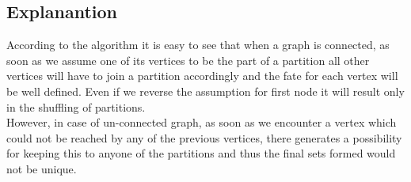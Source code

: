 \documentclass[20pt]{article}
\begin{document}
\subsection{Explanantion}
According to the algorithm it is easy to see that when a graph is connected, as soon as we assume one of its vertices to be the part of a partition all other vertices will have to join a partition accordingly and the fate for each vertex will be well defined. Even if we reverse the assumption for first node it will result only in the shuffling of partitions. \\
However, in case of un-connected graph, as soon as we encounter a vertex which could not be reached by any of the previous vertices, there generates a possibility for keeping this to anyone of the partitions and thus the final sets formed would not be unique.
\end{document}
